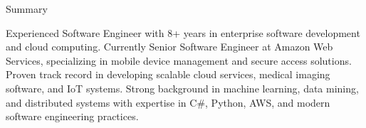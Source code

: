 
\begin{rSection}{Summary}

Experienced Software Engineer with 8+ years in enterprise software development and cloud computing. Currently Senior Software Engineer at Amazon Web Services, specializing in mobile device management and secure access solutions. Proven track record in developing scalable cloud services, medical imaging software, and IoT systems. Strong background in machine learning, data mining, and distributed systems with expertise in C\#, Python, AWS, and modern software engineering practices.

\end{rSection}
